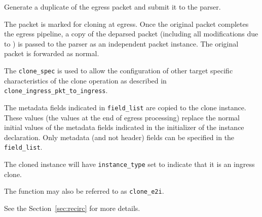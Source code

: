 \documentclass[12pt]{article}
\begin{document}
{ %
Generate a duplicate of the egress packet and submit it to the parser.
}
{ %
}
{ %
The packet is marked for cloning at egress. Once the original packet completes 
the egress pipeline, a copy of the deparsed packet (including all modifications 
due to \matchaction) is passed to the parser as an independent packet instance. 
The original packet is forwarded as normal.

The \texttt{clone_spec} is used to allow the configuration of other target specific 
characteristics of the clone operation as described in \texttt{clone_ingress_pkt_to_ingress}. 


The metadata fields indicated in \texttt{field_list} are copied to the clone instance. These 
values (the values at the end of egress processing) replace the normal initial values of the metadata fields indicated 
in the initializer of the instance declaration. Only metadata (and not header) fields can be specified in the \texttt{field_list}.

The cloned instance will have \texttt{instance_type} set to indicate that it is an 
ingress clone. 

The function may also be referred to as \texttt{clone_e2i}.

See the Section~\ref{sec:recirc} for more details.

}

\end{document}

